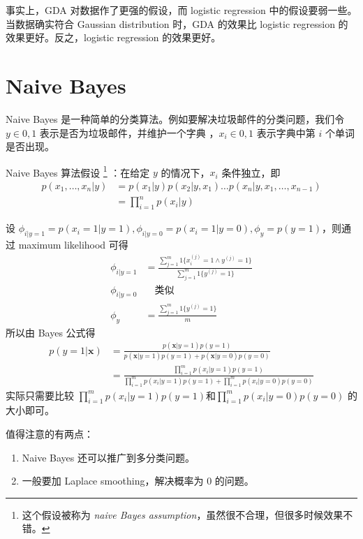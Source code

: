 			事实上，GDA 对数据作了更强的假设，而 logistic regression 中的假设要弱一些。当数据确实符合 Gaussian distribution 时，GDA 的效果比 logistic 
			regression 的效果更好。反之，logistic regression 的效果更好。
			
	\section{Naive Bayes} 
		Naive Bayes 是一种简单的分类算法。例如要解决垃圾邮件的分类问题，我们令 $ y \in {0, 1} $ 表示是否为垃圾邮件，并维护一个字典 ，$ x_i \in {0, 1} $ 表示字典中第 $ i $ 个单词是否出现。
		
		Naive Bayes 算法假设
		\footnote{这个假设被称为 \emph{naive Bayes assumption}，虽然很不合理，但很多时候效果不错。}
		：在给定 $ y $ 的情况下，$ x_i $ 条件独立，即
		\begin{align*}
			p(x_1, \ldots, x_n | y) &= p(x_1 | y) p(x_2 | y, x_1) \ldots p(x_n | y, x_1, \ldots, x_{n-1}) \\
			&= \prod_{i=1}^{n} p(x_i | y)
		\end{align*}
		
		设 $ \phi_{i | y=1} = p(x_i=1 | y=1), \phi_{i | y=0} = p(x_i=1 | y=0), \phi_y = p(y=1)$，则通过 maximum likelihood 可得
		\begin{align}
			\phi_{i | y=1} &= \frac {\sum_{j=1}^{m}1\{ x_i^{(j)}=1 \land y^{(j)}=1 \}} {\sum_{j=1}^{m}1\{y^{(j)}=1\}} \\
			\phi_{i | y=0} &\quad\text{类似} \\
			\phi_y &= \frac{\sum_{j=1}^{m}1\{y^{(j)}=1\}}{m}
		\end{align}
		所以由 Bayes 公式得
		\begin{align*}
			p(y=1 | \bm{x}) &= \frac{p(\bm{x} | y=1) p(y=1)}{p(\bm{x} | y=1) p(y=1) + p(\bm{x} | y=0) p(y=0)} \\
			&= \frac { \prod_{i=1}^{m} p(x_i | y=1) p(y=1) } { \prod_{i=1}^{m} p(x_i | y=1) p(y=1) + \prod_{i=1}^{m} p(x_i | y=0) p(y=0) }
		\end{align*}
		实际只需要比较 $ \prod_{i=1}^{m} p(x_i | y=1) p(y=1) \text{和} \prod_{i=1}^{m} p(x_i | y=0) p(y=0) $ 的大小即可。
		
		值得注意的有两点：
		\begin{enumerate}
			\item Naive Bayes 还可以推广到多分类问题。
			\item 一般要加 Laplace smoothing，解决概率为 $ 0 $ 的问题。
		\end{enumerate}
		